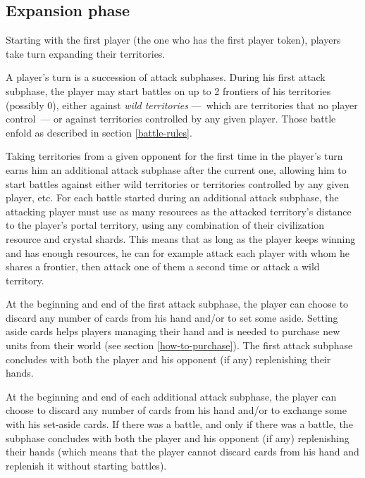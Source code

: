 \documentclass[a4paper]{article}
\begin{document}
\newpage
    \subsection{Expansion phase}
        \label{expansion}    
        Starting with the first player (the one who has the first player token),
        players take turn expanding their territories.
        
        A player's turn is a succession of attack subphases.
        During his first attack subphase, the player may start battles on up to 2 frontiers
        of his territories (possibly 0), either against \textit{wild territories}
        ---~which are territories that no player control~---
        or against territories controlled by any given player.
        Those battle enfold as described in section \ref{battle-rules}.        
        
        Taking territories from a given opponent for the first time in the player's turn
        earns him an additional attack subphase after the current one,
        allowing him to start battles against either wild territories or territories
        controlled by any given player, etc.
        For each battle started during an additional attack subphase,
        the attacking player must use as many resources as the attacked
        territory's distance to the player's portal territory,
        using any combination of their civilization resource and crystal shards.
        This means that as long as the player keeps winning and has enough resources,
        he can for example attack each player with whom he shares a frontier,
        then attack one of them a second time or attack a wild territory.
        
        At the beginning and end of the first attack subphase,
        the player can choose to discard any number of cards from his hand
        and/or to set some aside.        
        Setting aside cards helps players managing their hand
        and is needed to purchase new units from their world
        (see section \ref{how-to-purchase}).
        The first attack subphase concludes with both the player and his opponent
        (if any) replenishing their hands.
        
        At the beginning and end of each additional attack subphase,
        the player can choose to discard any number of cards from his hand
        and/or to exchange some with his set-aside cards.
        If there was a battle, and only if there was a battle,
        the subphase concludes with both the player and his opponent (if any)
        replenishing their hands (which means that the player cannot discard cards from
        his hand and replenish it without starting battles).
        
\end{document}

